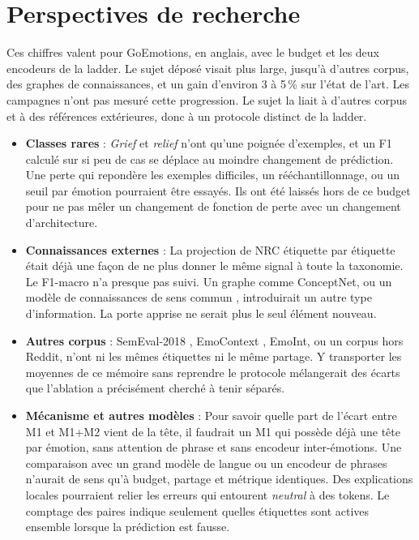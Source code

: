 \section*{Perspectives de recherche}
Ces chiffres valent pour GoEmotions, en anglais, avec le budget et les
deux encodeurs de la ladder. Le sujet déposé visait plus large, jusqu'à
d'autres corpus, des graphes de connaissances, et un gain d'environ
3 à 5\,\% sur l'état de l'art. Les campagnes n'ont pas mesuré cette
progression. Le sujet la liait à d'autres corpus et à des références
extérieures, donc à un protocole distinct de la ladder.
\begin{itemize}
\item \textbf{Classes rares} : \emph{Grief} et \emph{relief} n'ont qu'une
      poignée d'exemples, et un F1 calculé sur si peu de cas se déplace
      au moindre changement de prédiction. Une perte qui repondère les
      exemples difficiles, un rééchantillonnage, ou un seuil par émotion
      \cite{lin2017focal,chawla2002smote} pourraient être essayés. Ils
      ont été laissés hors de ce budget pour ne pas mêler un changement
      de fonction de perte avec un changement d'architecture.
\item \textbf{Connaissances externes} : La projection de NRC étiquette
      par étiquette était déjà une façon de ne plus donner le même
      signal à toute la taxonomie. Le F1-macro n'a presque pas suivi.
      Un graphe comme ConceptNet, ou un modèle de connaissances de sens
      commun \cite{speer2017,ghosal2020cosmic}, introduirait un autre
      type d'information. La porte apprise ne serait plus le seul
      élément nouveau.
\item \textbf{Autres corpus} : SemEval-2018 \cite{mohammad2018semeval},
      EmoContext \cite{semeval2019emocontext}, EmoInt, ou un corpus hors
      Reddit, n'ont ni les mêmes étiquettes ni le même partage. Y
      transporter les moyennes de ce mémoire sans reprendre le protocole
      mélangerait des écarts que l'ablation a précisément cherché à
      tenir séparés.
\item \textbf{Mécanisme et autres modèles} : Pour savoir quelle part de
      l'écart entre M1 et M1+M2 vient de la tête, il faudrait un M1 qui
      possède déjà une tête par émotion, sans attention de phrase et
      sans encodeur inter-émotions. Une comparaison avec un grand modèle
      de langue ou un encodeur de phrases
      \cite{reimers2019sentence,sharma2024deeplearningmlc} n'aurait de
      sens qu'à budget, partage et métrique identiques. Des explications
      locales \cite{ribeiro2016lime,clark2019bert} pourraient relier les
      erreurs qui entourent \emph{neutral} à des tokens. Le comptage des
      paires indique seulement quelles étiquettes sont actives ensemble
      lorsque la prédiction est fausse.
\end{itemize}

